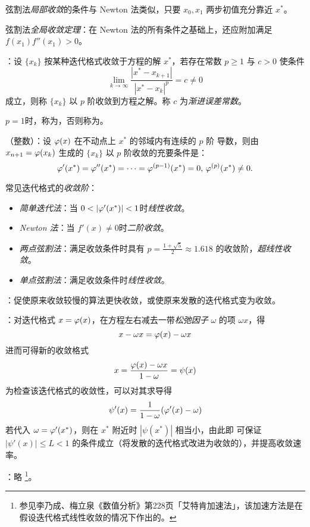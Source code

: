 \trm 弦割法\emph{局部收敛}的条件与 Newton 法类似，只要 $x_0,x_1$ 两步初值充分靠近 $x^\ast$。

\trm 弦割法\emph{全局收敛定理}：在 Newton 法的所有条件之基础上，还应附加满足 $f(x_1)f''(x_1)
>0$。

 {}：设 $\{x_k\}$ 按某种迭代格式收敛于方程的解 $x^\ast$，若存在常数 $p\geq1$
与 $c>0$ 使条件
\begin{equation}
\lim_{k\to\infty}\frac{|x^\ast-x_{k+1}|}{|x^\ast-x_k|^p}=c\neq0
\end{equation}
成立，则称 $\{x_k\}$ 以 $p$ 阶收敛到方程之解。称 $c$ 为\emph{渐进误差常数}。

\entry $p=1$时，称为，否则称为。

\trm （整数）：设 $\varphi(x)$ 在不动点上 $x^\ast$ 的邻域内有连续的 $p$ 阶
导数，则由 $x_{n+1}=\varphi(x_k)$ 生成的 $\{x_k\}$ 以 $p$ 阶收敛的充要条件是：
\[\varphi'(x^\ast)=\varphi''(x^\ast)=\cdots=\varphi^{(p-1)}(x^\ast)=0,\,\varphi^{(p)}
(x^\ast)\neq0.\]

\entry 常见迭代格式的\emph{收敛阶}：
\begin{itemize}\tl
    \item \emph{简单迭代法}：当 $0<|\vphi'(x^\ast)|<1$时\emph{线性收敛}。
    \item \emph{Newton 法}：当 $f'(x)\neq0$时\emph{二阶收敛}。
    \item \emph{两点弦割法}：满足收敛条件时具有 $p=\frac{1+\sqrt5}2\approx1.618$ 的收敛阶，\emph{超线性收敛}。
    \item \emph{单点弦割法}：满足收敛条件时\emph{线性收敛}。 
\end{itemize}

\entry {}：促使原来收敛较慢的算法更快收敛，或使原来发散的迭代格式变为收敛。

\entry {}：对迭代格式 $x=\varphi(x)$，在方程左右减去一带\emph{松弛因子} $\omega$
的项 $\omega x$，得
\[ x-\omega x=\varphi(x)-\omega x \]
进而可得新的收敛格式
\begin{equation}
x=\frac{\varphi(x)-\omega x}{1-\omega}=\psi(x)
\end{equation}
为检查该迭代格式的收敛性，可以对其求导得
\[ \psi'(x)=\frac1{1-\omega}(\varphi'(x)-\omega) \]
若代入 $\omega=\varphi'(x^\ast)$，则在 $x^\ast$ 附近时 $|\psi(x^\ast)|$ 相当小，由此即
可保证 $|\psi'(x)|\leq L<1$ 的条件成立（将发散的迭代格式改进为收敛的），并提高收敛速率。

\entry {}：略
\footnote{参见李乃成、梅立泉《数值分析》第228页「艾特肯加速法」，该加速方法是在假设迭代格式线性收敛的情况下作出的。}。
